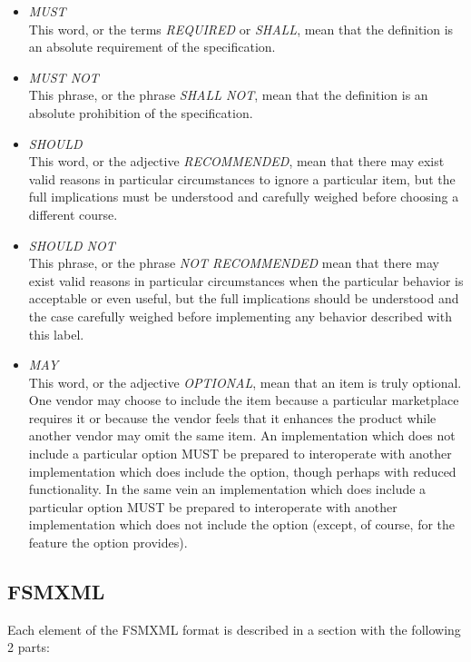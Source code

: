 \documentclass[a4paper]{article}
\begin{document}
\begin{itemize}
\item \emph{MUST}\\This word, or the terms \emph{REQUIRED} or
  \emph{SHALL}, mean that the definition is an absolute requirement of
  the specification.

\item \emph{MUST NOT}\\This phrase, or the phrase \emph{SHALL NOT},
  mean that the definition is an absolute prohibition of the
  specification.

\item \emph{SHOULD}\\This word, or the adjective \emph{RECOMMENDED},
  mean that there may exist valid reasons in particular circumstances
  to ignore a particular item, but the full implications must be
  understood and carefully weighed before choosing a different course.

\item \emph{SHOULD NOT}\\This phrase, or the phrase \emph{NOT
    RECOMMENDED} mean that there may exist valid reasons in particular
  circumstances when the particular behavior is acceptable or even
  useful, but the full implications should be understood and the case
  carefully weighed before implementing any behavior described with
  this label.

\item \emph{MAY}\\This word, or the adjective \emph{OPTIONAL}, mean
  that an item is truly optional.  One vendor may choose to include
  the item because a particular marketplace requires it or because the
  vendor feels that it enhances the product while another vendor may
  omit the same item.  An implementation which does not include a
  particular option MUST be prepared to interoperate with another
  implementation which does include the option, though perhaps with
  reduced functionality. In the same vein an implementation which does
  include a particular option MUST be prepared to interoperate with
  another implementation which does not include the option (except, of
  course, for the feature the option provides).
\end{itemize}

\subsection{FSMXML}

Each element of the FSMXML format is described in a section with the
following 2 parts:
\end{document}
